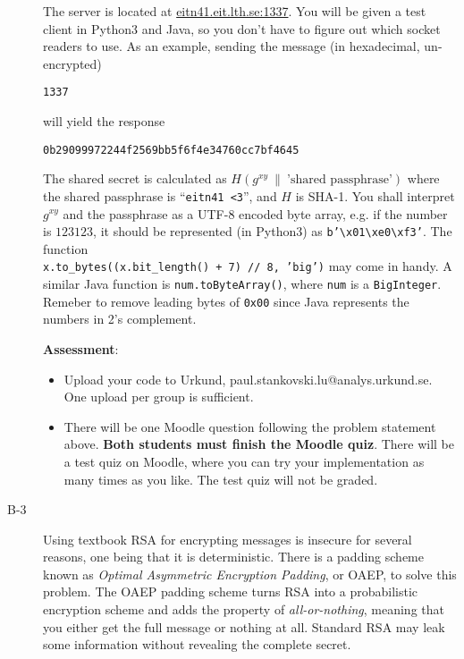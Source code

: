 \documentclass{article}
\begin{document}
\begin{description}
{    \clearpage

	The server is located at \url{eitn41.eit.lth.se:1337}. You will be given a test client in Python3 and Java, so
    you don't have to figure out which socket readers to use. As an example, sending the message 
    (in hexadecimal, un-encrypted)
    \begin{center}
    \texttt{1337}
    \end{center}
    will yield the response
    \begin{center}
    \texttt{0b29099972244f2569bb5f6f4e34760cc7bf4645}
    \end{center}
    
    The shared secret is calculated as
    $H(g^{xy} ~\| ~\textrm{'shared passphrase'})$
    where the shared passphrase is ``\texttt{eitn41~<3}'', and $H$ is SHA-1. 
    You shall interpret $g^{xy}$ and the passphrase as a UTF-8 encoded byte array, e.g. if the number is $123123$,
    it should be represented (in Python3) as \texttt{b'\textbackslash x01\textbackslash xe0\textbackslash xf3'}. 
    The function \\
    \texttt{x.to\_bytes((x.bit\_length() + 7) // 8, 'big')} may come in handy. A similar Java function is
    \texttt{num.toByteArray()}, where \texttt{num} is a \texttt{BigInteger}. Remeber to remove leading bytes of 
    \texttt{0x00} since Java represents the numbers in 2's complement.

	\textbf{Assessment}:
	\begin{itemize}
		\item Upload your code to Urkund, paul.stankovski.lu@analys.urkund.se.
        One upload per group is sufficient.
        
		\item There will be one Moodle question following the problem statement above. 
        \textbf{Both students must finish the Moodle quiz}.
        There will be a test quiz on Moodle, where you can try your implementation as many times as you like. 
        The test quiz will not be graded.
	\end{itemize}
    }

	\item[B-3]{Using textbook RSA for encrypting messages is insecure for several reasons, one being that it
    is deterministic. There is a padding scheme known as \emph{Optimal Asymmetric Encryption Padding}, or OAEP, to solve
    this problem. The OAEP padding scheme turns RSA into a probabilistic encryption scheme and adds the property
    of \emph{all-or-nothing}, meaning that you either get the full message or nothing at all. Standard RSA may leak some
    information without revealing the complete secret.
    
}
\end{description}
\end{document}
